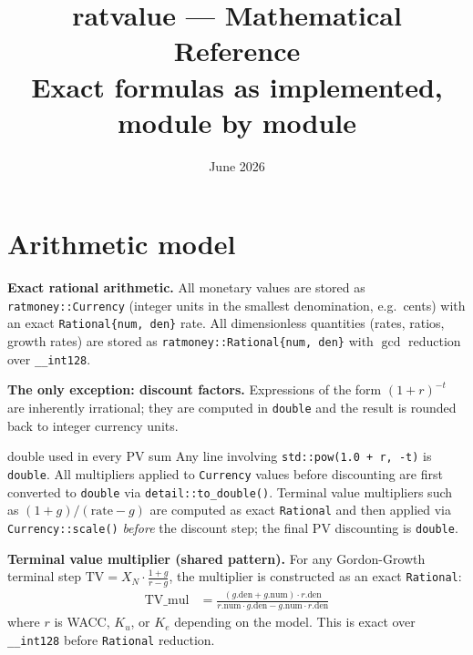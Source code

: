\documentclass[11pt, a4paper, oneside]{article}
\title{\textbf{ratvalue} --- Mathematical Reference\\[0.4em]
\large Exact formulas as implemented, module by module}
\author{}
\date{June 2026}
\newcommand{\TV}{\mathrm{TV}}
\newcommand{\Ke}{K_e}
\newcommand{\Ku}{K_u}
\begin{document}
\maketitle
\tableofcontents
\newpage

\section{Arithmetic model}
\label{sec:arith}

\textbf{Exact rational arithmetic.} All monetary values are stored as
\texttt{ratmoney::Currency} (integer units in the smallest denomination,
e.g.\ cents) with an exact \texttt{Rational\{num, den\}} rate.
All dimensionless quantities (rates, ratios, growth rates) are stored as
\texttt{ratmoney::Rational\{num, den\}} with $\gcd$ reduction over
\texttt{\_\_int128}.

\textbf{The only exception: discount factors.} Expressions of the form
$(1+r)^{-t}$ are inherently irrational; they are computed in \texttt{double}
and the result is rounded back to integer currency units.

\begin{impl}{double used in every PV sum}
Any line involving \texttt{std::pow(1.0 + r, -t)} is \texttt{double}.
All multipliers applied to \texttt{Currency} values before discounting are
first converted to \texttt{double} via \texttt{detail::to\_double()}.
Terminal value multipliers such as $(1+g)/(\mathrm{rate}-g)$ are computed
as exact \texttt{Rational} and then applied via \texttt{Currency::scale()}
\emph{before} the discount step; the final PV discounting is \texttt{double}.
\end{impl}

\textbf{Terminal value multiplier (shared pattern).}
For any Gordon-Growth terminal step $\TV = X_N \cdot \tfrac{1+g}{r-g}$,
the multiplier is constructed as an exact \texttt{Rational}:
\begin{align}
  \TV\_\mathrm{mul} &= \frac{(g.\mathrm{den}+g.\mathrm{num})\cdot r.\mathrm{den}}
                            {r.\mathrm{num}\cdot g.\mathrm{den}
                             - g.\mathrm{num}\cdot r.\mathrm{den}}
  \label{eq:tv_mul}
\end{align}
where $r$ is WACC, $\Ku$, or $\Ke$ depending on the model.
This is exact over \texttt{\_\_int128} before \texttt{Rational} reduction.
\end{document}
